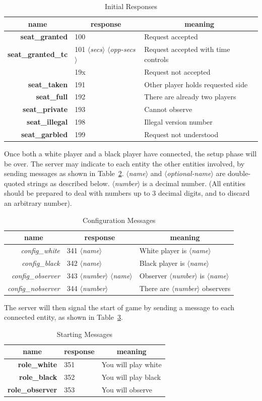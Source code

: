 \documentclass{article}
\newenvironment{resptab}[2]{
\begin{table}%
\centering
\caption{#2}%
\label{table-#1}%
\begin{tabular}{rll}%
\multicolumn{1}{c}{\bf name}&%
\multicolumn{1}{c}{\bf response}&%
\multicolumn{1}{c}{\bf meaning}\\\hline
}{\end{tabular}%
\end{table}}
\newcommand{\stok}[1]{{$\langle${\em #1}$\rangle$}}
\newcommand{\bfid}[1]{{\bf #1}}
\newcommand{\itid}[1]{{\it #1}}
\begin{document}
\begin{resptab}{initresp}{Initial Responses}
\bfid{seat\_granted}	& 100	& Request accepted \\
\bfid{seat\_granted\_tc}& 101 \stok{secs}
			      \stok{opp-secs} &
				  Request accepted with time
			          controls \\
			& 19x	& Request not accepted \\
\bfid{seat\_taken}	& 191	& Other player holds requested side \\
\bfid{seat\_full}	& 192	& There are already two players \\
\bfid{seat\_private}	& 193	& Cannot observe \\
\bfid{seat\_illegal}    & 198	& Illegal version number \\
\bfid{seat\_garbled}    & 199	& Request not understood
\end{resptab}

Once both a white player and a black player have
connected, the setup phase will be over.  The server may
indicate to each entity the other entities involved, by
sending messages as shown in
Table~\ref{table-configresp}. \stok{name} and \stok{optional-name} are
double-quoted strings as described below. \stok{number} is a
decimal number. (All entities should be prepared to deal
with numbers up to 3 decimal digits, and to discard an
arbitrary number).

\begin{resptab}{configresp}{Configuration Messages}
\itid{config\_white}	    & 341 \stok{name}	  & White player is \stok{name} \\
\itid{config\_black}	    & 342 \stok{name}	  & Black player is \stok{name} \\
\itid{config\_observer}  & 343 \stok{number} \stok{name} & Observer \stok{number} is \stok{name} \\
\itid{config\_nobserver} & 344 \stok{number}	  & There are \stok{number} observers
\end{resptab}

The server will then signal the start of game by sending
a message to each connected entity, as shown
in Table~\ref{table-startresp}.

\begin{resptab}{startresp}{Starting Messages}
\bfid{role\_white}    & 351 & You will play white \\
\bfid{role\_black}    & 352 & You will play black \\
\bfid{role\_observer} & 353 & You will observe
\end{resptab}
\end{document}
